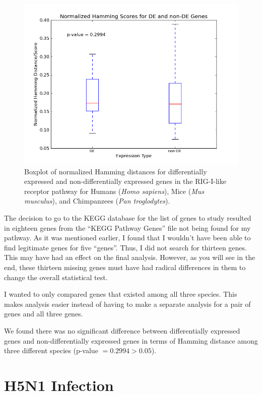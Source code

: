 \documentclass[12pt, a4paper]{report}
\begin{document}
\begin{figure}[ht]
\begin{center}
\includegraphics[width=12cm]{boxplot.png}
\caption{Boxplot of normalized Hamming distances for differentially expressed and non-differentially expressed genes in the RIG-I-like receptor pathway for Humans (\emph{Homo sapiens}), Mice (\emph{Mus musculus}), and Chimpanzees (\emph{Pan troglodytes}).\label{boxplot}}
\end{center}
\end{figure}

The decision to go to the KEGG database for the list of genes to study resulted in eighteen genes from the ``KEGG Pathway Genes'' file not being found for my pathway. As it was mentioned earlier, I found that I wouldn't have been able to find legitimate genes for five ``genes''. Thus, I did not search for thirteen genes. This may have had an effect on the final analysis. However, as you will see in the end, these thirteen missing genes must have had radical differences in them to change the overall statistical test.

I wanted to only compared genes that existed among all three species. This makes analysis easier instead of having to make a separate analysis for a pair of genes and all three genes.

We found there was no significant difference between differentially expressed genes and non-differentially expressed genes in terms of Hamming distance among three different species (p-value $= 0.2994 > 0.05$).

\section*{H5N1 Infection}
\end{document}
